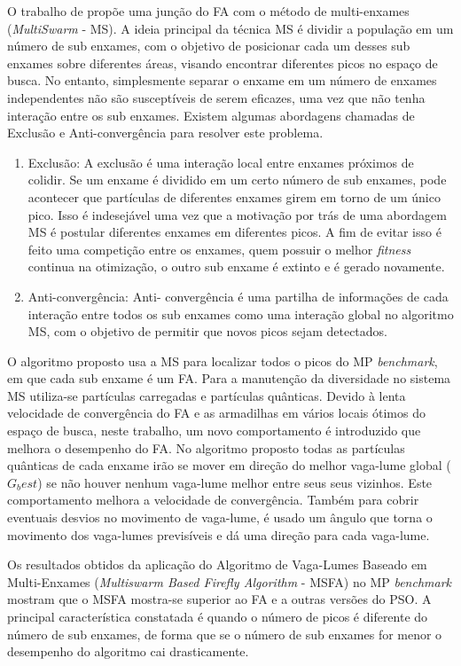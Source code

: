 O trabalho de \cite{farahani2011multiswarm} propõe uma junção do FA com o método de multi-enxames (\textit{MultiSwarm} - MS). A ideia principal da técnica MS é dividir a população em um número de sub enxames, com o objetivo de posicionar cada um desses sub enxames sobre diferentes áreas, visando encontrar diferentes picos no espaço de busca. No entanto, simplesmente separar o enxame em um número de enxames independentes não são susceptíveis de serem eficazes, uma vez que não tenha interação entre os sub enxames. Existem algumas abordagens chamadas de Exclusão e Anti-convergência para resolver este problema.

\begin{enumerate}
\item Exclusão: A exclusão é uma interação local entre enxames próximos de colidir. Se um enxame é dividido em um certo número de sub enxames, pode acontecer que partículas de diferentes enxames girem em torno de um único pico. Isso é indesejável uma vez que a motivação por trás de uma abordagem MS é postular diferentes enxames em diferentes picos. A fim de evitar isso é feito uma competição entre os enxames, quem possuir o melhor \textit{fitness} continua na otimização, o outro sub enxame é extinto e é gerado novamente.

\item Anti-convergência: Anti- convergência é uma partilha de informações de cada interação entre todos os sub enxames como uma interação global no algoritmo MS, com o objetivo de permitir que novos picos sejam detectados.
\end{enumerate}

O algoritmo proposto usa a MS para localizar todos o picos do MP \textit{benchmark}, em que cada sub enxame é um FA. Para a manutenção da diversidade no sistema MS utiliza-se partículas carregadas e partículas quânticas. Devido à lenta velocidade de convergência do FA e as armadilhas em vários locais ótimos do espaço de busca, neste trabalho, um novo comportamento é introduzido que melhora o desempenho do FA. No algoritmo proposto todas as partículas quânticas de cada enxame irão se mover em direção do melhor vaga-lume global ($G_best$) se não houver nenhum vaga-lume melhor entre seus seus vizinhos. Este comportamento melhora a velocidade de convergência. Também para cobrir eventuais desvios no movimento de vaga-lume, é usado um ângulo que torna o movimento dos vaga-lumes previsíveis e dá uma direção para cada vaga-lume.

Os resultados obtidos da aplicação do Algoritmo de Vaga-Lumes Baseado em Multi-Enxames (\textit{Multiswarm Based Firefly Algorithm} - MSFA) no MP \textit{benchmark} mostram que o MSFA mostra-se superior ao FA e a outras versões do PSO. A principal característica constatada é quando o número de picos é diferente do número de sub enxames, de forma que se o número de sub enxames for menor o desempenho do algoritmo cai drasticamente.

